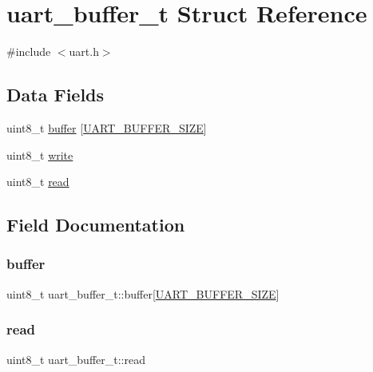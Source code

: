 \hypertarget{structuart__buffer__t}{}\section{uart\+\_\+buffer\+\_\+t Struct Reference}
\label{structuart__buffer__t}


{\ttfamily \#include $<$uart.\+h$>$}

\subsection*{Data Fields}
\begin{DoxyCompactItemize}
\item 
uint8\+\_\+t \hyperlink{structuart__buffer__t_a29b5ac9b39596f3aef136f0510df34c3}{buffer} \mbox{[}\hyperlink{config_8h_a0d57378e32bf8278011460740bc29f7f}{U\+A\+R\+T\+\_\+\+B\+U\+F\+F\+E\+R\+\_\+\+S\+I\+ZE}\mbox{]}
\item 
uint8\+\_\+t \hyperlink{structuart__buffer__t_aa894600d0e69b57eb7423c772fc9fd8c}{write}
\item 
uint8\+\_\+t \hyperlink{structuart__buffer__t_a199607933b5752494894e70d8cb91158}{read}
\end{DoxyCompactItemize}


\subsection{Field Documentation}
\mbox{\label{structuart__buffer__t_a29b5ac9b39596f3aef136f0510df34c3}} 
\subsubsection{\texorpdfstring{buffer}{buffer}}
{\footnotesize\ttfamily uint8\+\_\+t uart\+\_\+buffer\+\_\+t\+::buffer\mbox{[}\hyperlink{config_8h_a0d57378e32bf8278011460740bc29f7f}{U\+A\+R\+T\+\_\+\+B\+U\+F\+F\+E\+R\+\_\+\+S\+I\+ZE}\mbox{]}}

\mbox{\label{structuart__buffer__t_a199607933b5752494894e70d8cb91158}} 
\subsubsection{\texorpdfstring{read}{read}}
{\footnotesize\ttfamily uint8\+\_\+t uart\+\_\+buffer\+\_\+t\+::read}

